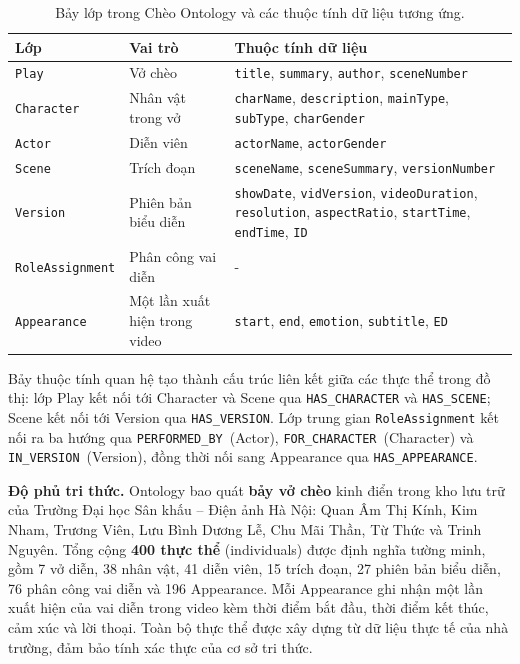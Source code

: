 \begin{table}[ht!]
  \centering
  \caption{Bảy lớp trong Chèo Ontology và các thuộc tính dữ liệu tương ứng.}
  \label{tab:ontology_classes}
  \renewcommand{\arraystretch}{1.35}
  \small
  \begin{tabular}{p{3.5cm} p{3.3cm} p{7.99cm}}
    \toprule
    \textbf{Lớp} & \textbf{Vai trò} & \textbf{Thuộc tính dữ liệu} \\
    \midrule
    \texttt{Play}
      & Vở chèo
      & \texttt{title}, \texttt{summary}, \texttt{author}, \texttt{sceneNumber} \\[2pt]
    \texttt{Character}
      & Nhân vật trong vở
      & \texttt{charName}, \texttt{description}, \texttt{mainType}, \texttt{subType}, \texttt{charGender} \\[2pt]
    \texttt{Actor}
      & Diễn viên
      & \texttt{actorName}, \texttt{actorGender} \\[2pt]
    \texttt{Scene}
      & Trích đoạn
      & \texttt{sceneName}, \texttt{sceneSummary}, \texttt{versionNumber} \\[2pt]
    \texttt{Version}
      & Phiên bản biểu diễn
      & \texttt{showDate}, \texttt{vidVersion}, \texttt{videoDuration}, \texttt{resolution},
        \texttt{aspectRatio}, \texttt{startTime}, \texttt{endTime}, \texttt{ID} \\[2pt]
    \texttt{RoleAssignment}
      &  Phân công vai diễn
      & - \\[2pt]
    \texttt{Appearance}
      & Một lần xuất hiện trong video
      & \texttt{start}, \texttt{end}, \texttt{emotion}, \texttt{subtitle}, \texttt{ED} \\
    \bottomrule
  \end{tabular}
\end{table}

Bảy thuộc tính quan hệ tạo thành cấu trúc liên kết giữa các thực thể trong đồ thị: lớp Play kết nối tới Character và Scene qua \texttt{HAS\_CHARACTER} và \texttt{HAS\_SCENE}; Scene kết nối tới Version qua \texttt{HAS\_VERSION}. Lớp trung gian \texttt{RoleAssignment} kết nối ra ba hướng qua \texttt{PERFORMED\_BY}~(Actor), \texttt{FOR\_CHARACTER}~(Character) và \texttt{IN\_VERSION}~(Version), đồng thời nối sang Appearance qua \texttt{HAS\_APPEARANCE}.

\textbf{Độ phủ tri thức.}
Ontology bao quát \textbf{bảy vở chèo} kinh điển trong kho lưu trữ của Trường Đại học Sân khấu – Điện ảnh Hà Nội: Quan Âm Thị Kính, Kim Nham, Trương Viên, Lưu Bình Dương Lễ, Chu Mãi Thần, Từ Thức và Trinh Nguyên. Tổng cộng \textbf{400 thực thể} (individuals) được định nghĩa tường minh, gồm 7 vở diễn, 38 nhân vật, 41 diễn viên, 15 trích đoạn, 27 phiên bản biểu diễn, 76 phân công vai diễn và 196 Appearance. Mỗi Appearance ghi nhận một lần xuất hiện của vai diễn trong video kèm thời điểm bắt đầu, thời điểm kết thúc, cảm xúc và lời thoại. Toàn bộ thực thể được xây dựng từ dữ liệu thực tế của nhà trường, đảm bảo tính xác thực của cơ sở tri thức.

